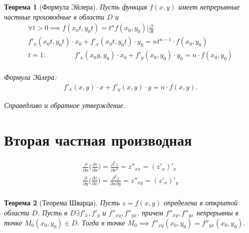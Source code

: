 \documentclass[a4paper,12pt,oneside]{extbook}
\theoremstyle{numbered}
\theoremstyle{unnumbered}
\theoremstyle{named}
\newtheorem{theorem}{Теорема}[section]
\theoremstyle{unnumbered}
\theoremstyle{named}
\theoremstyle{named}
\theoremstyle{named}
\begin{document}
\begin{theorem}[Формула Эйлера]
    Пусть функция \(f(x, y)\) имеет непрерывные частные производные в области \(D\) и
    \begin{gather*}
        \forall t > 0 \implies f(x_0t, y_0t) = t^n f(x_0, y_0) \Big| \frac{\partial}{\partial t} \\
        f'_x(x_0t, y_0t) \cdot x_0 + f'_x(x_0t, y_0t) \cdot y_0 = n t^{n - 1} \cdot f(x_0, y_0) \\
        t = 1: \qquad \qquad f'_x(x_0y, y_0) \cdot x_0 + f'_y(x_0, y_0) \cdot y_0 = n \cdot f(x_0, y_0) \\
    \end{gather*}

    Формула Эйлера:
    \begin{gather*}
        f'_x(x, y) \cdot x + f'_y(x, y) \cdot y = n \cdot f(x, y).
    \end{gather*}

    Справедливо и обратное утверждение.
\end{theorem}

\section{Вторая частная производная}%
\label{sec:Вторая частная производная}

\begin{gather*}
    \frac{\partial}{\partial x} \Big(\frac{\partial z}{\partial x}\Big) = \frac{\partial^2 z}{\partial x^2} = z''_{xx} = (z'_x)'_x \\
    \frac{\partial}{\partial y} \Big(\frac{\partial z}{\partial x}\Big) = \frac{\partial^2 z}{\partial x \partial y} = z''_{xy} = (z'_x)'_y \\
\end{gather*}

\begin{theorem}[Теорема Шварца]
    Пусть \(z = f(x, y)\) определена в открытой области \(D\). Пусть в \(D \exists f'_x, f'_y\) и \(f''_{xy}, f''_{yx}\), причем \(f''_{xy}, f''_{yx}\) непрерывны в точке \(M_0(x_0, y_0) \in D\). Тогда в точке \(M_0 \implies f''_{xy}(x_0, y_0) = f''_{yx}(x_0, y_0)\).
\end{theorem}
\end{document}
